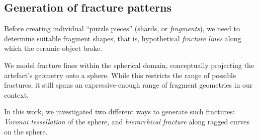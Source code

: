 \documentclass[acmlarge,screen,dvipsnames]{acmart}
\begin{document}
\subsection{Generation of fracture patterns}
\label{sec:fracture-patterns}

Before creating individual ``puzzle pieces'' (shards, or
\emph{fragments}), we need to determine suitable fragment shapes, that
is, hypothetical \emph{fracture lines} along which the ceramic object
broke.

We model fracture lines within the spherical domain, conceptually
projecting the artefact's geometry onto a sphere. While this restricts
the range of possible fractures, it still spans an expressive-enough
range of fragment geometries in our context.

In this work, we investigated two different ways to generate such
fractures: \emph{Voronoi tessellation} of the sphere, and
\emph{hierarchical fracture} along ragged curves on the sphere.
\end{document}
